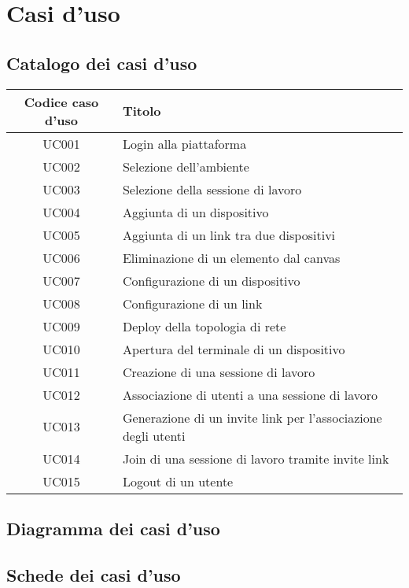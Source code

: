 \documentclass[../main.tex]{subfiles}
\begin{document}
\chapter{Casi d'uso}
\section{Catalogo dei casi d'uso}
\begin{tabularx}{150mm}{|c|X|}
    \hline
    \textbf{Codice caso d'uso}          & \textbf{Titolo} \\
    \hline
    UC001   &   Login alla piattaforma \\
    \hline
    UC002   &   Selezione dell'ambiente \\
    \hline
    UC003   &   Selezione della sessione di lavoro \\
    \hline
    UC004   &   Aggiunta di un dispositivo \\
    \hline
    UC005   &   Aggiunta di un link tra due dispositivi \\
    \hline
    UC006   &   Eliminazione di un elemento dal canvas \\
    \hline
    UC007   &   Configurazione di un dispositivo \\
    \hline
    UC008   &   Configurazione di un link \\
    \hline
    UC009   &   Deploy della topologia di rete \\ 
    \hline
    UC010   &   Apertura del terminale di un dispositivo \\
    \hline
    UC011   &   Creazione di una sessione di lavoro \\
    \hline
    UC012   &   Associazione di utenti a una sessione di lavoro \\
    \hline
    UC013   &   Generazione di un invite link per l'associazione degli utenti \\
    \hline
    UC014   &   Join di una sessione di lavoro tramite invite link \\
    \hline
    UC015   &   Logout di un utente \\
    \hline
\end{tabularx}
\newpage
\section{Diagramma dei casi d'uso}
\begin{figure}[H]
\centering

\end{figure}
\newpage
\section{Schede dei casi d'uso}

\end{document}
